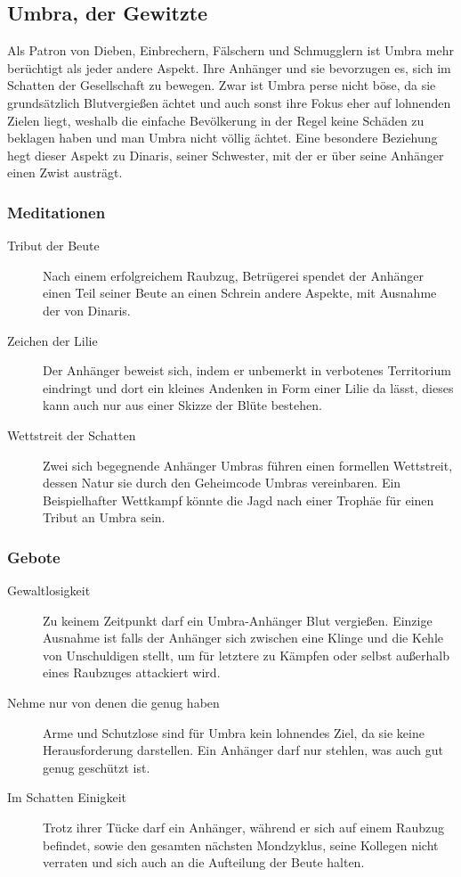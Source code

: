 \documentclass[a4paper,12pt,oneside]{book}
\begin{document}
\subsection{Umbra, der Gewitzte}
Als Patron von Dieben, Einbrechern, Fälschern und Schmugglern ist Umbra mehr berüchtigt als jeder andere Aspekt. Ihre Anhänger und sie bevorzugen es, sich im Schatten der Gesellschaft zu bewegen. Zwar ist Umbra perse nicht böse, da sie grundsätzlich Blutvergießen ächtet und auch sonst ihre Fokus eher auf lohnenden Zielen liegt, weshalb die einfache Bevölkerung in der Regel keine Schäden zu beklagen haben und man Umbra nicht völlig ächtet. Eine besondere Beziehung hegt dieser Aspekt zu Dinaris, seiner Schwester, mit der er über seine Anhänger einen Zwist austrägt. 
\subsubsection{Meditationen}
\begin{description}
\item[Tribut der Beute]
Nach einem erfolgreichem Raubzug, Betrügerei spendet der Anhänger einen Teil seiner Beute an einen Schrein andere Aspekte, mit Ausnahme der von Dinaris.
\item[Zeichen der Lilie]
Der Anhänger beweist sich, indem er unbemerkt in verbotenes Territorium eindringt und dort ein kleines Andenken in Form einer Lilie da lässt, dieses kann auch nur aus einer Skizze der Blüte bestehen.
\item[Wettstreit der Schatten]
Zwei sich begegnende Anhänger Umbras führen einen formellen Wettstreit, dessen Natur sie durch den Geheimcode Umbras vereinbaren. Ein Beispielhafter Wettkampf könnte die Jagd nach einer Trophäe für einen Tribut an Umbra sein.
\end{description}
\subsubsection{Gebote}
\begin{description}
\item[Gewaltlosigkeit]
Zu keinem Zeitpunkt darf ein Umbra-Anhänger Blut vergießen. Einzige Ausnahme ist falls der Anhänger sich zwischen eine Klinge und die Kehle von Unschuldigen stellt, um für letztere zu Kämpfen oder selbst außerhalb eines Raubzuges attackiert wird.
\item[Nehme nur von denen die genug haben]
Arme und Schutzlose sind für Umbra kein lohnendes Ziel, da sie keine Herausforderung darstellen. Ein Anhänger darf nur stehlen, was auch gut genug geschützt ist.
\item[Im Schatten Einigkeit]
Trotz ihrer Tücke darf ein Anhänger, während er sich auf einem Raubzug befindet, sowie den gesamten nächsten Mondzyklus, seine Kollegen nicht verraten und sich auch an die Aufteilung der Beute halten.
\end{description}
\end{document}
